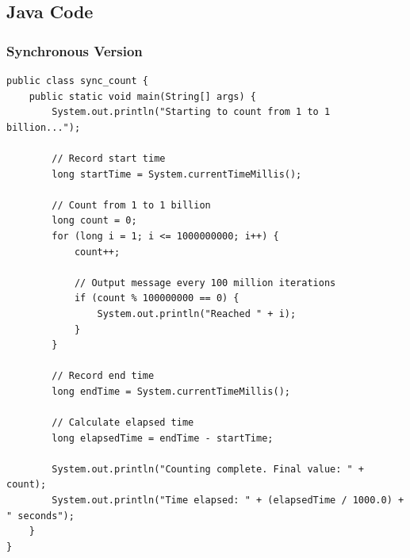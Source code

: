 \documentclass[12pt,a4paper]{article}
\begin{document}
\subsection{Java Code}

\subsubsection{Synchronous Version}
\begin{verbatim}
public class sync_count {
    public static void main(String[] args) {
        System.out.println("Starting to count from 1 to 1 billion...");
        
        // Record start time
        long startTime = System.currentTimeMillis();
        
        // Count from 1 to 1 billion
        long count = 0;
        for (long i = 1; i <= 1000000000; i++) {
            count++;
            
            // Output message every 100 million iterations
            if (count % 100000000 == 0) {
                System.out.println("Reached " + i);
            }
        }
        
        // Record end time
        long endTime = System.currentTimeMillis();
        
        // Calculate elapsed time
        long elapsedTime = endTime - startTime;
        
        System.out.println("Counting complete. Final value: " + count);
        System.out.println("Time elapsed: " + (elapsedTime / 1000.0) + " seconds");
    }
}
\end{verbatim}
\end{document}
